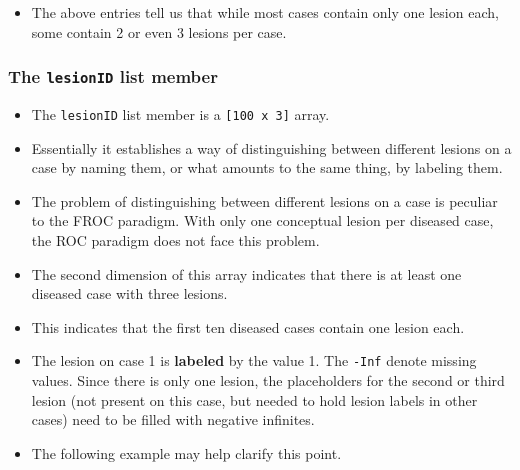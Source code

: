 \documentclass[]{book}
\newenvironment{Shaded}{\begin{snugshade}}{\end{snugshade}}
\newcommand{\CommentTok}[1]{\textcolor[rgb]{0.56,0.35,0.01}{\textit{#1}}}
\newcommand{\DecValTok}[1]{\textcolor[rgb]{0.00,0.00,0.81}{#1}}
\newcommand{\NormalTok}[1]{#1}
\newcommand{\OperatorTok}[1]{\textcolor[rgb]{0.81,0.36,0.00}{\textbf{#1}}}
\providecommand{\tightlist}{%
  \setlength{\itemsep}{0pt}\setlength{\parskip}{0pt}}
\begin{document}
\begin{itemize}
\tightlist
\item
  The above entries tell us that while most cases contain only one lesion each, some contain 2 or even 3 lesions per case.
\end{itemize}

\hypertarget{the-lesionid-list-member}{%
\subsubsection{\texorpdfstring{The \texttt{lesionID} list member}{The lesionID list member}}\label{the-lesionid-list-member}}

\begin{itemize}
\tightlist
\item
  The \texttt{lesionID} list member is a \texttt{{[}100\ x\ 3{]}} array.
\item
  Essentially it establishes a way of distinguishing between different lesions on a case by naming them, or what amounts to the same thing, by labeling them.
\item
  The problem of distinguishing between different lesions on a case is peculiar to the FROC paradigm. With only one conceptual lesion per diseased case, the ROC paradigm does not face this problem.
\item
  The second dimension of this array indicates that there is at least one diseased case with three lesions.
\end{itemize}

\begin{Shaded}
\end{Shaded}

\begin{itemize}
\tightlist
\item
  This indicates that the first ten diseased cases contain one lesion each.
\item
  The lesion on case 1 is \textbf{labeled} by the value 1. The \texttt{-Inf} denote missing values. Since there is only one lesion, the placeholders for the second or third lesion (not present on this case, but needed to hold lesion labels in other cases) need to be filled with negative infinites.
\item
  The following example may help clarify this point.
\end{itemize}
\end{document}
